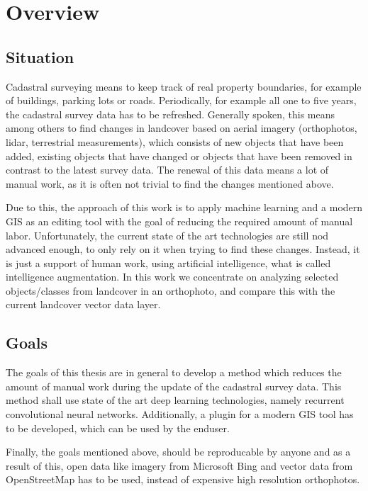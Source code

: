 
\chapter{Overview}\label{chp:overview}
\section{Situation}
Cadastral surveying means to keep track of real property boundaries, for example of buildings, parking lots or roads. Periodically, for example all one to five years, the cadastral survey data has to be refreshed. Generally spoken, this means among others to find changes in landcover based on aerial imagery (orthophotos, lidar, terrestrial measurements), which consists of new objects that have been added, existing objects that have changed or objects that have been removed in contrast to the latest survey data. The renewal of this data means a lot of manual work, as it is often not trivial to find the changes mentioned above.

Due to this, the approach of this work is to apply machine learning and a modern GIS as an editing tool with the goal of reducing the required amount of manual labor. Unfortunately, the current state of the art technologies are still nod advanced enough, to only rely on it when trying to find these changes. Instead, it is just a support of human work, using artificial intelligence, what is called intelligence augmentation. In this work we concentrate on analyzing selected objects/classes from landcover in an orthophoto, and compare this with the current landcover vector data layer.

\section{Goals}
The goals of this thesis are in general to develop a method which reduces the amount of manual work during the update of the cadastral survey data. This method shall use state of the art deep learning technologies, namely recurrent convolutional neural networks. Additionally, a plugin for a modern GIS tool has to be developed, which can be used by the enduser.

Finally, the goals mentioned above, should be reproducable by anyone and as a result of this, open data like imagery from Microsoft Bing and vector data from OpenStreetMap has to be used, instead of expensive high resolution orthophotos.

